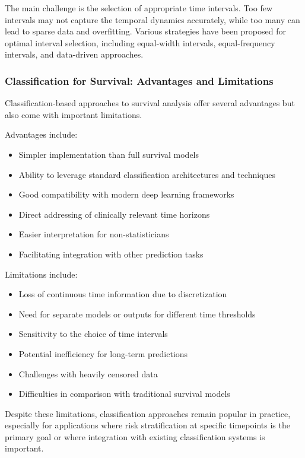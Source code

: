 The main challenge is the selection of appropriate time intervals. Too few intervals may not capture the temporal dynamics accurately, while too many can lead to sparse data and overfitting. Various strategies have been proposed for optimal interval selection, including equal-width intervals, equal-frequency intervals, and data-driven approaches.

\subsubsection{Classification for Survival: Advantages and Limitations}

Classification-based approaches to survival analysis offer several advantages but also come with important limitations.

Advantages include:
\begin{itemize}
\item Simpler implementation than full survival models
\item Ability to leverage standard classification architectures and techniques
\item Good compatibility with modern deep learning frameworks
\item Direct addressing of clinically relevant time horizons
\item Easier interpretation for non-statisticians
\item Facilitating integration with other prediction tasks
\end{itemize}

Limitations include:
\begin{itemize}
\item Loss of continuous time information due to discretization
\item Need for separate models or outputs for different time thresholds
\item Sensitivity to the choice of time intervals
\item Potential inefficiency for long-term predictions
\item Challenges with heavily censored data
\item Difficulties in comparison with traditional survival models
\end{itemize}

Despite these limitations, classification approaches remain popular in practice, especially for applications where risk stratification at specific timepoints is the primary goal or where integration with existing classification systems is important.

